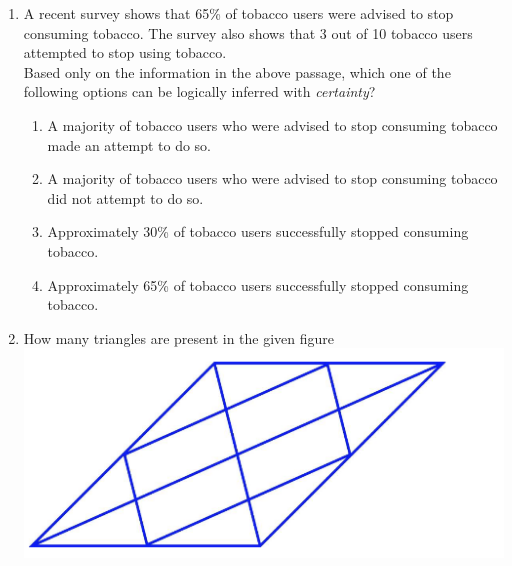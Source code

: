 \documentclass[12pt]{article}
\theoremstyle{remark}
\begin{document}
\begin{enumerate}
\begin{enumerate}
 \end{enumerate}
\hfill{}
\item A recent survey shows that 65\% of tobacco users were advised to stop consuming tobacco. The survey also shows that 3 out of 10 tobacco users attempted to stop using tobacco.\\
Based only on the information in the above passage, which one of the following options can be logically inferred with \textit{certainty}?\\ 
\begin{enumerate}
\item A majority of tobacco users who were advised to stop consuming tobacco made an attempt to do so.
\item A majority of tobacco users who were advised to stop consuming tobacco did not attempt to do so. 
\item Approximately 30\% of tobacco users successfully stopped consuming tobacco. 
\item Approximately 65\% of tobacco users successfully stopped consuming tobacco.
\end{enumerate}
\hfill{}
\item How many triangles are present in the given figure\\ 
\includegraphics{Figs/Q5.png}\\ 


\end{enumerate}
\end{document}
